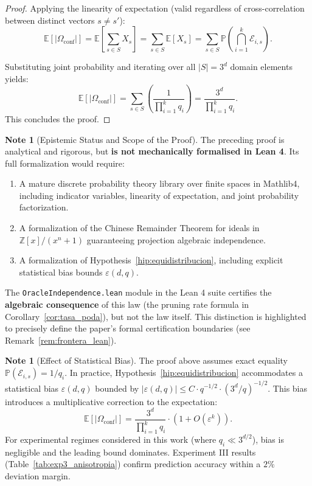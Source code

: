 \documentclass[11pt,a4paper]{article}
\theoremstyle{plain}
\theoremstyle{definition}
\newtheorem{remark}[teorema]{Note}
\numberwithin{equation}{section}
\newcommand{\ZZ}{\mathbb{Z}}
\newcommand{\E}{\mathbb{E}}
\newcommand{\Prob}{\mathbb{P}}
\begin{document}
\begin{proof}
Applying the linearity of expectation (valid regardless of cross-correlation between distinct vectors $s \neq s'$):
\begin{equation}
\E[|\Omega_{\mathrm{conf}}|] = \E \left[ \sum_{s \in S} X_s \right] = \sum_{s \in S} \E[X_s] = \sum_{s \in S} \Prob \left( \bigcap_{i=1}^k \mathcal{E}_{i, s} \right).
\end{equation}

Substituting joint probability and iterating over all $|S| = 3^d$ domain elements yields:
\begin{equation}
\E[|\Omega_{\mathrm{conf}}|] = \sum_{s \in S} \left( \frac{1}{\prod_{i=1}^k q_i} \right) = \frac{3^d}{\prod_{i=1}^k q_i}.
\end{equation}
This concludes the proof.
\end{proof}

\begin{remark}[Epistemic Status and Scope of the Proof]
\label{rem:estatus_apendice}
The preceding proof is analytical and rigorous, but \textbf{is not mechanically formalised in Lean 4}. Its full formalization would require:
\begin{enumerate}
    \item A mature discrete probability theory library over finite spaces in Mathlib4, including indicator variables, linearity of expectation, and joint probability factorization.
    \item A formalization of the Chinese Remainder Theorem for ideals in $\ZZ[x]/(x^n+1)$ guaranteeing projection algebraic independence.
    \item A formalization of Hypothesis~\ref{hip:equidistribucion}, including explicit statistical bias bounds $\varepsilon(d, q)$.
\end{enumerate}
The \texttt{OracleIndependence.lean} module in the Lean 4 suite certifies the \textbf{algebraic consequence} of this law (the pruning rate formula in Corollary~\ref{cor:tasa_poda}), but not the law itself. This distinction is highlighted to precisely define the paper's formal certification boundaries (see Remark~\ref{rem:frontera_lean}).
\end{remark}

\begin{remark}[Effect of Statistical Bias]
\label{rem:sesgo_estadistico}
The proof above assumes exact equality $\Prob(\mathcal{E}_{i, s}) = 1/q_i$. In practice, Hypothesis~\ref{hip:equidistribucion} accommodates a statistical bias $\varepsilon(d, q)$ bounded by $|\varepsilon(d, q)| \le C \cdot q^{-1/2} \cdot (3^d/q)^{-1/2}$. This bias introduces a multiplicative correction to the expectation:
\begin{equation}
\E[|\Omega_{\mathrm{conf}}|] = \frac{3^d}{\prod_{i=1}^k q_i} \cdot (1 + O(\varepsilon^k)).
\end{equation}
For experimental regimes considered in this work (where $q_i \ll 3^{d/2}$), bias is negligible and the leading bound dominates. Experiment III results (Table~\ref{tab:exp3_anisotropia}) confirm prediction accuracy within a $2\%$ deviation margin.
\end{remark}
\end{document}
